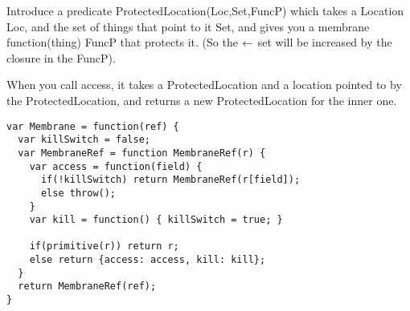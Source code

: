 \documentclass[a4paper]{article}
\begin{document}
Introduce a predicate ProtectedLocation(Loc,Set,FuncP) which takes a
Location Loc, and the set of things that point to it Set, and gives you a
membrane function(thing) FuncP that protects it. (So the $\leftarrow$ set will be
increased by the closure in the FuncP).

When you call access, it takes a ProtectedLocation and a location pointed to
by the ProtectedLocation, and returns a new ProtectedLocation for the inner
one.

\begin{verbatim}
var Membrane = function(ref) {
  var killSwitch = false;
  var MembraneRef = function MembraneRef(r) {
    var access = function(field) {
      if(!killSwitch) return MembraneRef(r[field]);
      else throw();
    }
    var kill = function() { killSwitch = true; }

    if(primitive(r)) return r;
    else return {access: access, kill: kill};
  }
  return MembraneRef(ref);
}
\end{verbatim}



\end{document}
